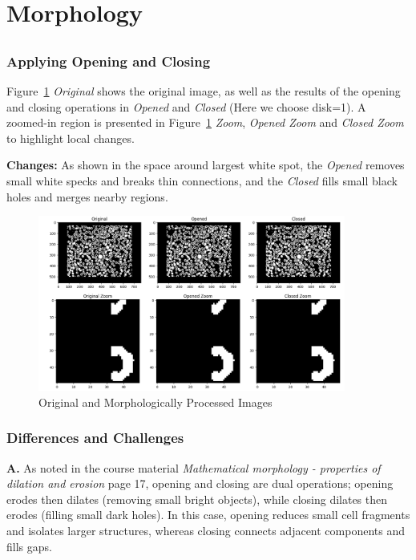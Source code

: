 \documentclass[12pt]{article}
\begin{document}
\subsection{}


\section{Morphology}
\subsection{} %

\subsubsection{Applying Opening and Closing} %

Figure~\ref{fig:full_images} \textit{Original} shows the original image, as well as the results of the opening and closing operations in \textit{Opened} and \textit{Closed} (Here we choose disk=1). A zoomed-in region is presented in Figure~\ref{fig:full_images} \textit{Zoom}, \textit{Opened Zoom} and \textit{Closed Zoom} to highlight local changes.

\textbf{Changes: } As shown in the space around largest white spot, the \textit{Opened} removes small white specks and breaks thin connections, and the \textit{Closed} fills small black holes and merges nearby regions.

\begin{figure}[ht]
    \centering
        \includegraphics[width=0.9\textwidth]{pics/a7-4.1.1}
    \caption{Original and Morphologically Processed Images}
    \label{fig:full_images}
\end{figure}


\subsubsection{Differences and Challenges} %
\textbf{A. } As noted in the course material \textit{Mathematical morphology - properties of dilation and erosion} page 17, opening and closing are dual operations; opening erodes then dilates (removing small bright objects), while closing dilates then erodes (filling small dark holes). In this case, opening reduces small cell fragments and isolates larger structures, whereas closing connects adjacent components and fills gaps.
\end{document}
